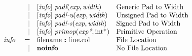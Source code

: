 \documentclass[12pt]{article}
\begin{document}
\[
\begin{array}{rrll}
                &\vert &[\text{\em info}]\  \text{\em pad!}(\text{\em exp}, \text{\em width})                                      &\text{Generic Pad to Width}\\
                &\vert &[\text{\em info}]\  \text{\em pad!-u}(\text{\em exp}, \text{\em width})                                    &\text{Unsigned Pad to Width}\\
                &\vert &[\text{\em info}]\  \text{\em pad!-s}(\text{\em exp}, \text{\em width})                                    &\text{Signed Pad to Width}\\
                &\vert &[\text{\em info}]\  \text{\em primop}(\text{\em exp*}, \text{int}\text{*})                                 &\text{Primitive Operation}\\
\text{\em info\ }       &=     &\text{filename } \text{\bf :\ } \text{line} . \text{col}                              &\text{File Location}\\
                &\vert &\text{\bf noinfo\ }                                                                   &\text{No File Location}\\
\end{array}
\]
\end{document}
